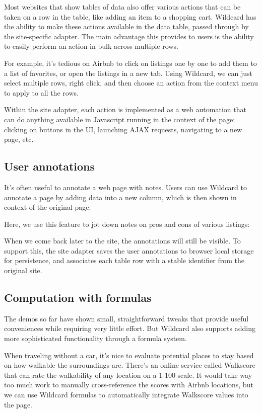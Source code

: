 \documentclass[english,submission]{programming}
\begin{document}
Most websites that show tables of data also offer various actions that
can be taken on a row in the table, like adding an item to a shopping
cart. Wildcard has the ability to make these actions available in the
data table, passed through by the site-specific adapter. The main
advantage this provides to users is the ability to easily perform an
action in bulk across multiple rows.

For example, it's tedious on Airbnb to click on listings one by one to
add them to a list of favorites, or open the listings in a new tab.
Using Wildcard, we can just select multiple rows, right click, and then
choose an action from the context menu to apply to all the rows.

Within the site adapter, each action is implemented as a web automation
that can do anything available in Javascript running in the context of
the page: clicking on buttons in the UI, launching AJAX requests,
navigating to a new page, etc.

\hypertarget{user-annotations}{%
\subsection{User annotations}\label{user-annotations}}

It's often useful to annotate a web page with notes. Users can use
Wildcard to annotate a page by adding data into a new column, which is
then shown in context of the original page.

Here, we use this feature to jot down notes on pros and cons of various
listings:

When we come back later to the site, the annotations will still be
visible. To support this, the site adapter saves the user annotations to
browser local storage for persistence, and associates each table row
with a stable identifier from the original site.

\hypertarget{computation-with-formulas}{%
\subsection{Computation with formulas}\label{computation-with-formulas}}

The demos so far have shown small, straightforward tweaks that provide
useful conveniences while requiring very little effort. But Wildcard
also supports adding more sophisticated functionality through a formula
system.

When traveling without a car, it's nice to evaluate potential places to
stay based on how walkable the surroundings are. There's an online
service called Walkscore that can rate the walkability of any location
on a 1-100 scale. It would take way too much work to manually
cross-reference the scores with Airbnb locations, but we can use
Wildcard formulas to automatically integrate Walkscore values into the
page.
\end{document}
